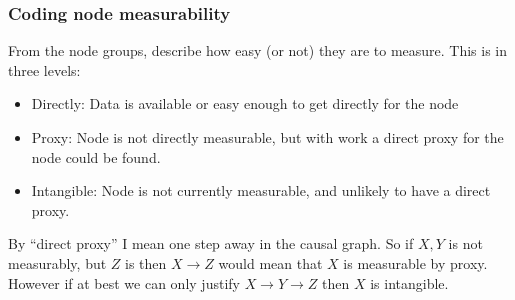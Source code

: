 \documentclass[
  letterpaper,
  DIV=11,
  numbers=noendperiod]{scrartcl}
\providecommand{\tightlist}{%
  \setlength{\itemsep}{0pt}\setlength{\parskip}{0pt}}
\begin{document}
\subsubsection{Coding node
measurability}\label{coding-node-measurability}

From the node groups, describe how easy (or not) they are to measure.
This is in three levels:

\begin{itemize}
\tightlist
\item
  Directly: Data is available or easy enough to get directly for the
  node
\item
  Proxy: Node is not directly measurable, but with work a direct proxy
  for the node could be found.
\item
  Intangible: Node is not currently measurable, and unlikely to have a
  direct proxy.
\end{itemize}

By ``direct proxy'' I mean one step away in the causal graph. So if
\(X,Y\) is not measurably, but \(Z\) is then \(X\rightarrow Z\) would
mean that \(X\) is measurable by proxy. However if at best we can only
justify \(X \rightarrow Y \rightarrow Z\) then \(X\) is intangible.
\end{document}
